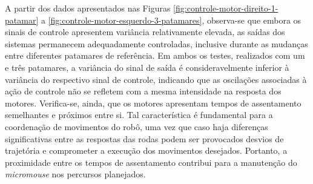             \begin{table}[!htbp]	
				\centering
			\end{table}


            A partir dos dados apresentados nas Figuras \ref{fig:controle-motor-direito-1-patamar} a \ref{fig:controle-motor-esquerdo-3-patamares}, observa-se que embora os sinais de controle apresentem variância relativamente elevada, as saídas dos sistemas permanecem adequadamente controladas, inclusive durante as mudanças entre diferentes patamares de referência. Em ambos os testes, realizados com um e três patamares, a variância do sinal de saída é consideravelmente inferior à variância do respectivo sinal de controle, indicando que as oscilações associadas à ação de controle não se refletem com a mesma intensidade na resposta dos motores. Verifica-se, ainda, que os motores apresentam tempos de assentamento semelhantes e próximos entre si. Tal característica é fundamental para a coordenação de movimentos do robô, uma vez que caso haja diferenças significativas entre as respostas das rodas podem ser provocados desvios de trajetória e comprometer a execução dos movimentos desejados. Portanto, a proximidade entre os tempos de assentamento contribui para a manutenção do \textit{micromouse} nos percursos planejados.

